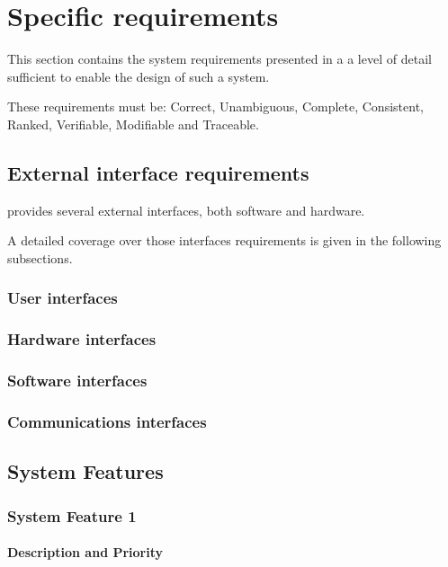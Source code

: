 \section{Specific requirements}
This section contains the system requirements presented in a a level of detail sufficient to enable the design of such a system.\par
These requirements must be: Correct, Unambiguous, Complete, Consistent, Ranked, Verifiable, Modifiable and Traceable.
\subsection{External interface requirements}
\myTaxiService{} provides several external interfaces, both software and hardware.\par
A detailed coverage over those interfaces requirements is given in the following subsections.
\subsubsection{User interfaces}
\subsubsection{Hardware interfaces}
\subsubsection{Software interfaces}
\subsubsection{Communications interfaces}
\subsection{System Features}
\subsubsection{System Feature 1}
\paragraph{Description and Priority}
